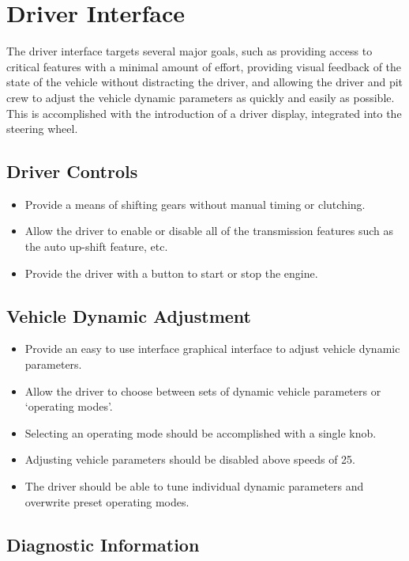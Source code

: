 \section{Driver Interface}

The driver interface targets several major goals, such as providing access to critical features with a minimal amount of effort, providing visual feedback of the state of the vehicle without distracting the driver, and allowing the driver and pit crew to adjust the vehicle dynamic parameters as quickly and easily as possible. This is accomplished with the introduction of a driver display, integrated into the steering wheel.

\subsection{Driver Controls}

\begin{itemize}
\item Provide a means of shifting gears without manual timing or clutching.
\item Allow the driver to enable or disable all of the transmission features such as the auto up-shift feature, etc.
\item Provide the driver with a button to start or stop the engine. 
\end{itemize}

\subsection{Vehicle Dynamic Adjustment}

\begin{itemize}
\item Provide an easy to use interface graphical interface to adjust vehicle dynamic parameters.
\item Allow the driver to choose between sets of dynamic vehicle parameters or `operating modes'.
\item Selecting an operating mode should be accomplished with a single knob.
\item Adjusting vehicle parameters should be disabled above speeds of \unit{25}{\kilo\metre\per\hour}.
\item The driver should be able to tune individual dynamic parameters and overwrite preset operating modes.
\end{itemize}

\subsection{Diagnostic Information}

